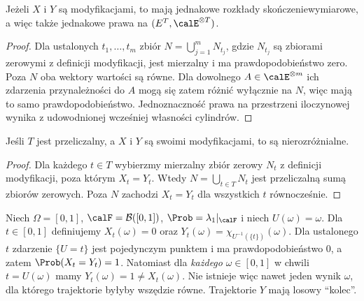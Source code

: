 \begin{stwierdzenie}
Jeżeli $X$ i $Y$ są modyfikacjami, to mają jednakowe
rozkłady skończeniewymiarowe, a więc także jednakowe prawa
na $(E^T,\calE^{\otimes T})$.
\end{stwierdzenie}
\begin{proof}
Dla ustalonych $t_1,\ldots,t_m$ zbiór
$N=\bigcup_{j=1}^m N_{t_j}$, gdzie $N_{t_j}$ są zbiorami
zerowymi z definicji modyfikacji, jest mierzalny
i ma prawdopodobieństwo zero. Poza $N$ oba wektory wartości
są równe. Dla dowolnego $A\in\calE^{\otimes m}$ ich
zdarzenia przynależności do $A$ mogą się zatem różnić
wyłącznie na $N$, więc mają to samo prawdopodobieństwo.
Jednoznaczność prawa na przestrzeni iloczynowej wynika
z udowodnionej wcześniej własności cylindrów.
\end{proof}

\begin{stwierdzenie}
Jeśli $T$ jest przeliczalny, a $X$ i $Y$ są swoimi
modyfikacjami, to są nierozróżnialne.
\end{stwierdzenie}
\begin{proof}
Dla każdego $t\in T$ wybierzmy mierzalny zbiór zerowy $N_t$
z definicji modyfikacji, poza którym $X_t=Y_t$.
Wtedy $N=\bigcup_{t\in T}N_t$ jest przeliczalną sumą
zbiorów zerowych. Poza $N$ zachodzi $X_t=Y_t$ dla
wszystkich $t$ równocześnie.
\end{proof}

\begin{przyklad}
Niech $\Omega=[0,1]$, $\calF=\mathcal B([0,1])$,
$\Prob=\lambda_1|_{\calF}$ i niech $U(\omega)=\omega$. Dla $t\in[0,1]$ definiujemy
$X_t(\omega)=0$ oraz $Y_t(\omega)=\chi_{U^{-1}(\{t\})}(\omega)$.
Dla ustalonego $t$ zdarzenie $\{U=t\}$ jest pojedynczym
punktem i ma prawdopodobieństwo $0$, a zatem
$\Prob(X_t=Y_t)=1$. Natomiast dla \emph{każdego}
$\omega\in[0,1]$ w chwili $t=U(\omega)$ mamy
$Y_t(\omega)=1\ne X_t(\omega)$. Nie istnieje więc
nawet jeden wynik $\omega$, dla którego trajektorie byłyby
wszędzie równe. Trajektorie $Y$ mają losowy ``kolec''.
\end{przyklad}

